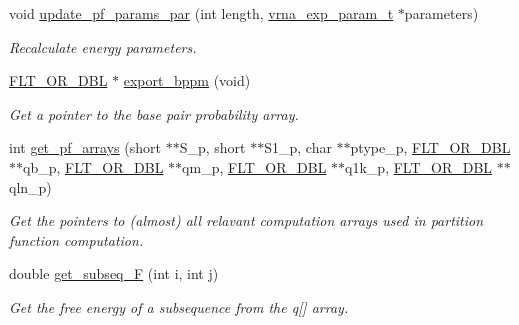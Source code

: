 \begin{DoxyCompactItemize}
void \hyperlink{group__part__func__global__deprecated_gaafe2d1b21f5418b123b088aa395e827d}{update\+\_\+pf\+\_\+params\+\_\+par} (int length, \hyperlink{group__energy__parameters_ga01d8b92fe734df8d79a6169482c7d8d8}{vrna\+\_\+exp\+\_\+param\+\_\+t} $\ast$parameters)
\begin{DoxyCompactList}\small\item\em Recalculate energy parameters. \end{DoxyCompactList}\item 
\hyperlink{group__data__structures_ga31125aeace516926bf7f251f759b6126}{F\+L\+T\+\_\+\+O\+R\+\_\+\+D\+BL} $\ast$ \hyperlink{group__part__func__global__deprecated_gac5ac7ee281aae1c5cc5898a841178073}{export\+\_\+bppm} (void)
\begin{DoxyCompactList}\small\item\em Get a pointer to the base pair probability array. \end{DoxyCompactList}\item 
int \hyperlink{group__part__func__global__deprecated_ga42faebdfce6f070c5f89adfc8427525c}{get\+\_\+pf\+\_\+arrays} (short $\ast$$\ast$S\+\_\+p, short $\ast$$\ast$S1\+\_\+p, char $\ast$$\ast$ptype\+\_\+p, \hyperlink{group__data__structures_ga31125aeace516926bf7f251f759b6126}{F\+L\+T\+\_\+\+O\+R\+\_\+\+D\+BL} $\ast$$\ast$qb\+\_\+p, \hyperlink{group__data__structures_ga31125aeace516926bf7f251f759b6126}{F\+L\+T\+\_\+\+O\+R\+\_\+\+D\+BL} $\ast$$\ast$qm\+\_\+p, \hyperlink{group__data__structures_ga31125aeace516926bf7f251f759b6126}{F\+L\+T\+\_\+\+O\+R\+\_\+\+D\+BL} $\ast$$\ast$q1k\+\_\+p, \hyperlink{group__data__structures_ga31125aeace516926bf7f251f759b6126}{F\+L\+T\+\_\+\+O\+R\+\_\+\+D\+BL} $\ast$$\ast$qln\+\_\+p)
\begin{DoxyCompactList}\small\item\em Get the pointers to (almost) all relavant computation arrays used in partition function computation. \end{DoxyCompactList}\item 
\mbox{\label{group__part__func__global__deprecated_ga189e2a1ec6cc32c53ea72f7543b0441e}} 
double \hyperlink{group__part__func__global__deprecated_ga189e2a1ec6cc32c53ea72f7543b0441e}{get\+\_\+subseq\+\_\+F} (int i, int j)
\begin{DoxyCompactList}\small\item\em Get the free energy of a subsequence from the q\mbox{[}\mbox{]} array. \end{DoxyCompactList}\item 
$$
\end{DoxyCompactItemize}
